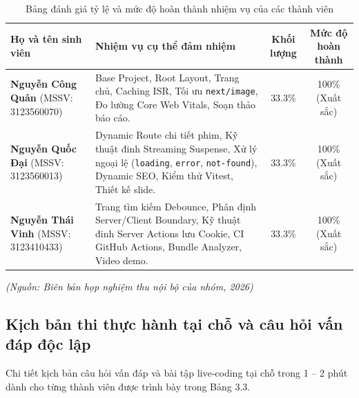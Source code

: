 \documentclass[13pt,a4paper]{extarticle}
\begin{document}
\begin{table}[H]
\centering
\caption{Bảng đánh giá tỷ lệ và mức độ hoàn thành nhiệm vụ của các thành viên}
\label{tab:contribution}
\begin{tabularx}{\textwidth}{>{\raggedright\arraybackslash}p{3.5cm}>{\raggedright\arraybackslash}Xcc}
\toprule
\textbf{Họ và tên sinh viên} & \textbf{Nhiệm vụ cụ thể đảm nhiệm} & \textbf{Khối lượng} & \textbf{Mức độ hoàn thành} \\
\midrule
\textbf{Nguyễn Công Quân} \newline (MSSV: 3123560070) & Base Project, Root Layout, Trang chủ, Caching ISR, Tối ưu \texttt{next/image}, Đo lường Core Web Vitals, Soạn thảo báo cáo. & 33.3\% & 100\% (Xuất sắc) \\
\midrule
\textbf{Nguyễn Quốc Đại} \newline (MSSV: 3123560013) & Dynamic Route chi tiết phim, Kỹ thuật đinh Streaming Suspense, Xử lý ngoại lệ (\texttt{loading}, \texttt{error}, \texttt{not-found}), Dynamic SEO, Kiểm thử Vitest, Thiết kế slide. & 33.3\% & 100\% (Xuất sắc) \\
\midrule
\textbf{Nguyễn Thái Vinh} \newline (MSSV: 3123410433) & Trang tìm kiếm Debounce, Phân định Server/Client Boundary, Kỹ thuật đinh Server Actions lưu Cookie, CI GitHub Actions, Bundle Analyzer, Video demo. & 33.3\% & 100\% (Xuất sắc) \\
\bottomrule
\end{tabularx}
\end{table}
\begin{flushleft}\small\textit{(Nguồn: Biên bản họp nghiệm thu nội bộ của nhóm, 2026)}\end{flushleft}

\subsection{Kịch bản thi thực hành tại chỗ và câu hỏi vấn đáp độc lập}
Chi tiết kịch bản câu hỏi vấn đáp và bài tập live-coding tại chỗ trong 1 -- 2 phút dành cho từng thành viên được trình bày trong Bảng 3.3.
\end{document}
